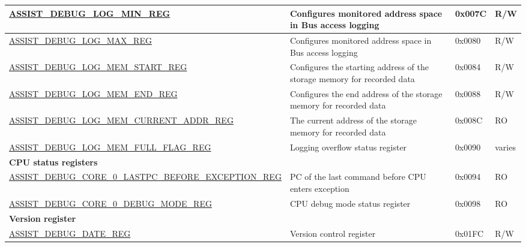 \begin{longtable}{ | l| m{4cm} | l | l | }
\hyperref[regdesc:ASSISTDEBUGLOGMINREG]{ASSIST\_DEBUG\_LOG\_MIN\_REG} & Configures monitored address space in Bus access logging & 0x007C & R/W \\ \hline
\hyperref[regdesc:ASSISTDEBUGLOGMAXREG]{ASSIST\_DEBUG\_LOG\_MAX\_REG} & Configures monitored address space in Bus access logging & 0x0080 & R/W \\ \hline
\hyperref[regdesc:ASSISTDEBUGLOGMEMSTARTREG]{ASSIST\_DEBUG\_LOG\_MEM\_START\_REG} & Configures the starting address of the storage memory for recorded data & 0x0084 & R/W \\ \hline
\hyperref[regdesc:ASSISTDEBUGLOGMEMENDREG]{ASSIST\_DEBUG\_LOG\_MEM\_END\_REG} & Configures the end address of the storage memory for recorded data & 0x0088 & R/W \\ \hline
\hyperref[regdesc:ASSISTDEBUGLOGMEMCURRENTADDRREG]{ASSIST\_DEBUG\_LOG\_MEM\_CURRENT\_ADDR\_REG} & The current address of the storage memory for recorded data & 0x008C & RO \\ \hline
\hyperref[regdesc:ASSISTDEBUGLOGMEMFULLFLAGREG]{ASSIST\_DEBUG\_LOG\_MEM\_FULL\_FLAG\_REG} & Logging overflow status register & 0x0090 & varies \\ \hline
\multicolumn{4}{|l|}{\textbf{CPU status registers}} \\ \hline
\hyperref[regdesc:ASSISTDEBUGCORE0LASTPCBEFOREEXCEPTIONREG]{ASSIST\_DEBUG\_CORE\_0\_LASTPC\_BEFORE\_EXCEPTION\_REG} & PC of the last command before CPU enters exception & 0x0094 & RO \\ \hline
\hyperref[regdesc:ASSISTDEBUGCORE0DEBUGMODEREG]{ASSIST\_DEBUG\_CORE\_0\_DEBUG\_MODE\_REG} & CPU debug mode status register & 0x0098 & RO \\ \hline
\multicolumn{4}{|l|}{\textbf{Version register}} \\ \hline
\hyperref[regdesc:ASSISTDEBUGDATEREG]{ASSIST\_DEBUG\_DATE\_REG} & Version control register & 0x01FC & R/W \\ \hline
\end{longtable}
